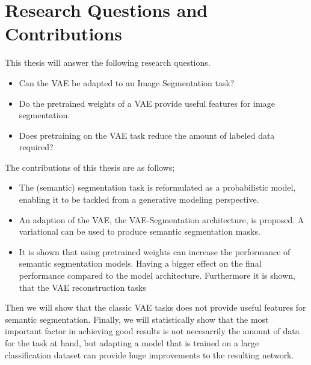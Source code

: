 \section{Research Questions and Contributions}
This thesis will answer the following research questions.
\begin{itemize}
    \item Can the VAE be adapted to an Image Segmentation task?
    \item Do the pretrained weights of a VAE provide useful features for image segmentation.
    \item Does pretraining on the VAE task reduce the amount of labeled data required?
\end{itemize}
The contributions of this thesis are as follows;
\begin{itemize}
    \item The (semantic) segmentation task is reformulated as a probabilistic model, enabling it to be tackled from a generative modeling perspective.
    \item An adaption of the VAE, the VAE-Segmentation architecture, is proposed. A variational  can be used to produce semantic segmentation masks.
    \item It is shown that using pretrained weights can increase the performance of semantic segmentation models. Having a bigger effect on the final performance compared to the model architecture. Furthermore it is shown, that the VAE reconstruction tasks
\end{itemize}
Then we will show that the classic VAE tasks does not provide useful features for semantic segmentation. Finally, we will statistically show that the most important factor in achieving good results is not necesarrily the amount of data for the task at hand, but adapting a model that is trained on a large classification dataset can provide huge improvements to the resulting network.
